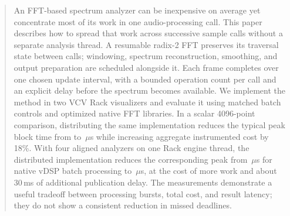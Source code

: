 \begin{abstract}
\noindent
An FFT-based spectrum analyzer can be inexpensive on average yet concentrate
most of its work in one audio-processing call. This paper describes how to
spread that work across successive sample calls without a separate analysis
thread. A resumable radix-2 FFT preserves its traversal state between calls;
windowing, spectrum reconstruction, smoothing, and output preparation are
scheduled alongside it. Each frame completes over one chosen update interval,
with a bounded operation count per call and an explicit delay before the
spectrum becomes available. We implement the method in two VCV Rack
visualizers and evaluate it using matched batch controls and optimized native
FFT libraries. In a scalar 4096-point comparison, distributing the same
implementation reduces the typical peak block time from
\StudyBatchPeak{} to \StudyCorePeak\,$\mu$s while increasing aggregate
instrumented cost by 18\%. With four aligned analyzers on one Rack engine
thread, the distributed implementation reduces the corresponding peak from
\StudyHostBatchPeak\,$\mu$s for native vDSP batch processing to
\StudyHostCorePeak\,$\mu$s, at the cost of more work and about 30\,ms of
additional publication delay. The measurements demonstrate a useful tradeoff
between processing bursts, total cost, and result latency; they do not show a
consistent reduction in missed deadlines.
\end{abstract}
